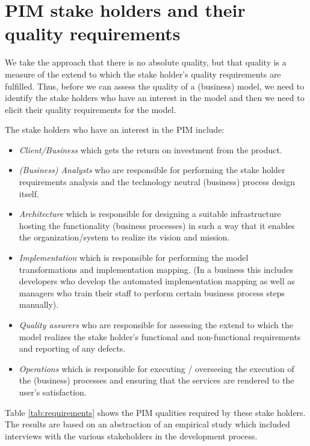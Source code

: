 \section{PIM stake holders and their quality requirements}
\label{sec:qualityRequirements}

We take the approach that there is no absolute quality, but that quality is a measure of the extend to which the stake holder's quality
requirements are fulfilled. Thus, before we can assess the quality of a (business) model, we need to identify the stake holders who
have an interest in the model and then we need to elicit their quality requirements for the model.

The stake holders who have an interest in the PIM include:
\begin{itemize}
\item \textit{Client/Business} which gets the return on investment from the product.
\item \textit{(Business) Analysts} who are responsible for performing the stake holder requirements analysis and the technology neutral (business) process design itself.
\item \textit{Architecture} which is responsible for designing a suitable infrastructure hosting the functionality (business processes) in such a way that it enables the organization/system to realize its vision and mission. 
\item \textit{Implementation} which is responsible for performing the model transformations and implementation mapping. (In a business this includes developers who develop the automated implementation mapping as well as managers who train their staff to perform certain business process steps manually).
\item \textit{Quality assurers} who are responsible for assessing the extend to which the model realizes the stake holder's functional and non-functional requirements and reporting of any defects.
\item \textit{Operations} which is responsible for executing / overseeing the execution of the (business) processes and ensuring that the services are rendered to the user's satisfaction.
\end{itemize}

Table \ref{tab:requirements} shows the PIM qualities required by these stake holders.
The results are based on an abstraction of an empirical study which included interviews with the various stakeholders in the development process.

